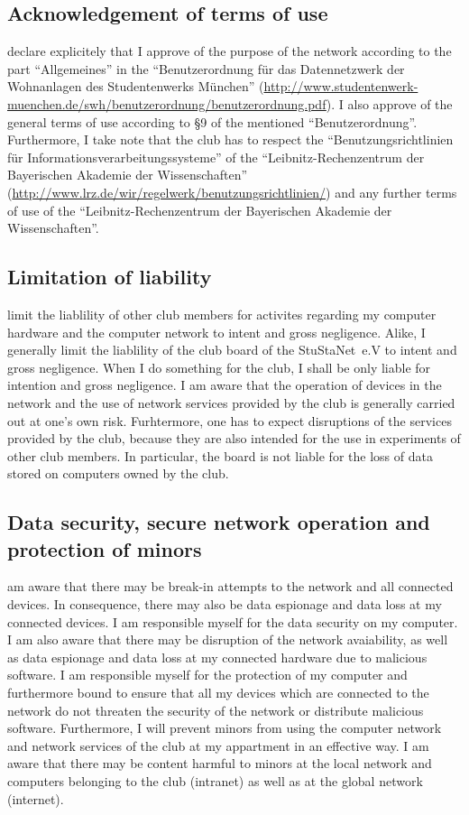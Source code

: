\documentclass[a4paper,10pt]{scrartcl}
\begin{document}
\subsection*{Acknowledgement of terms of use}
 declare explicitely that I approve of the purpose of the network according to the part \enquote{Allgemeines} in the \enquote{Benutzerordnung für das Datennetzwerk der Wohnanlagen des Studentenwerks München} (\url{http://www.studentenwerk-muenchen.de/swh/benutzerordnung/benutzerordnung.pdf}). I also approve of the general terms of use according to §9 of the mentioned \enquote{Benutzerordnung}. Furthermore, I take note that the club has to respect the \enquote{Benutzungsrichtlinien für Informationsverarbeitungssysteme} of the \enquote{Leibnitz-Rechenzentrum der Bayerischen Akademie der Wissenschaften} (\url{http://www.lrz.de/wir/regelwerk/benutzungsrichtlinien/}) and any further terms of use of the \enquote{Leibnitz-Rechenzentrum der Bayerischen Akademie der Wissenschaften}.

\subsection*{Limitation of liability}
 limit the liablility of other
club members for activites regarding my computer hardware and the computer network to intent and gross negligence. Alike, I generally limit the liablility of the club board of the StuStaNet~e.V to intent and gross negligence. When I do something for the club, I shall be only liable for intention and gross negligence. I am aware that the operation of devices in the network and the use of network services provided by the club is generally carried out at one's own risk. Furhtermore, one has to expect disruptions of the services provided by the club, because they are also intended for the use in experiments of other club members. In particular, the board is not liable for the loss of data stored on computers owned by the club.

\subsection*{Data security, secure network operation and protection of minors}
 am aware that there may be break-in attempts to the network and all connected devices. In consequence, there may also be data espionage and data loss at my connected devices. I am responsible myself for the data security on my computer. I am also aware that there may be disruption of the network avaiability, as well as data espionage and data loss at my connected hardware due to malicious software. I am responsible myself for the protection of my computer and furthermore bound to ensure that all my devices which are connected to the network do not threaten the security of the network or distribute malicious software. Furthermore, I will prevent minors from using the computer network and network services of the club at my appartment in an effective way. I am aware that there may be content harmful to minors at the local network and computers belonging to the club (intranet) as well as at the global network (internet). 
 
\end{document}
